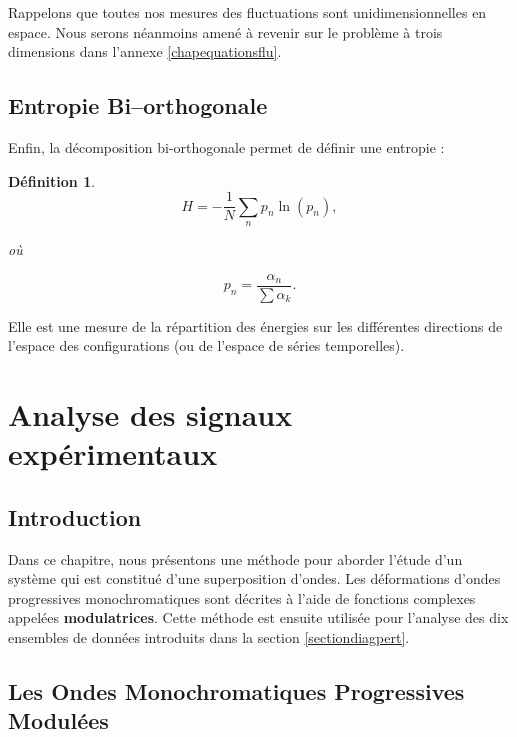 \documentclass{book}
\newtheorem{defn}{D\'efinition}[chapter]
\begin{document}
Rappelons que toutes nos mesures des
fluctuations sont unidimensionnelles en espace. Nous serons n\'eanmoins
amen\'e \`a revenir sur le probl\`eme \`a trois dimensions dans
l'annexe \ref{chapequationsflu}.

\section{Entropie Bi--orthogonale}
Enfin, la d\'ecomposition bi-orthogonale permet de d\'efinir une
entropie \cite{Aubry91a} :
\begin{defn}
\begin{equation}
H=-\frac{1}{N}\sum_n p_n \ln(p_n),
\end{equation}

o\`u

\begin{equation}
p_n=\frac{\alpha_n}{\sum \alpha_k}.
\end{equation}
\end{defn}
Elle est une mesure de la r\'epartition des \'energies sur
les diff\'erentes directions de l'espace des configurations (ou de
l'espace 
de s\'eries temporelles). 



\chapter{Analyse des signaux exp\'erimentaux}\label{chapanalyse}


\section{Introduction}

Dans ce chapitre, nous pr\'esentons une m\'ethode pour aborder l'\'etude
d'un syst\`eme qui est constitu\'e d'une superposition d'ondes.
Les d\'eformations d'ondes progressives monochromatiques sont
d\'ecrites \`a l'aide de fonctions complexes appel\'ees {\bf
modulatrices}. 
Cette m\'ethode est ensuite utilis\'ee pour l'analyse des dix ensembles
de donn\'ees introduits dans la section \ref{sectiondiagpert}.



\section[Les OMPM]{Les Ondes Monochromatiques Progressives
Modul\'ees}\label{sectionOMPM}  
\end{document}
